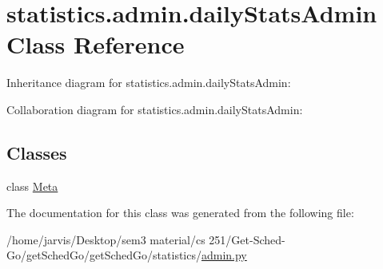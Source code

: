 \hypertarget{classstatistics_1_1admin_1_1dailyStatsAdmin}{}\section{statistics.\+admin.\+daily\+Stats\+Admin Class Reference}
\label{classstatistics_1_1admin_1_1dailyStatsAdmin}


Inheritance diagram for statistics.\+admin.\+daily\+Stats\+Admin\+:


Collaboration diagram for statistics.\+admin.\+daily\+Stats\+Admin\+:
\subsection*{Classes}
\begin{DoxyCompactItemize}
\item 
class \hyperlink{classstatistics_1_1admin_1_1dailyStatsAdmin_1_1Meta}{Meta}
\end{DoxyCompactItemize}


The documentation for this class was generated from the following file\+:\begin{DoxyCompactItemize}
\item 
/home/jarvis/\+Desktop/sem3 material/cs 251/\+Get-\/\+Sched-\/\+Go/get\+Sched\+Go/get\+Sched\+Go/statistics/\hyperlink{statistics_2admin_8py}{admin.\+py}\end{DoxyCompactItemize}
